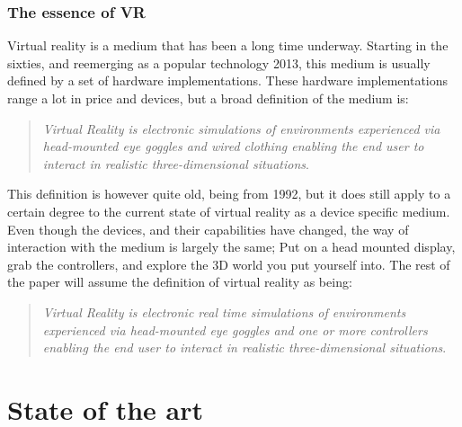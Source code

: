 		
		\subsubsection{The essence of VR}
		Virtual reality is a medium\cite{definingVirtualReality} that has been a long time underway. Starting in the sixties, and reemerging as a popular technology 2013, this medium is usually defined by a set of hardware implementations. These hardware implementations range a lot in price and devices, but a broad definition of the medium is:\\
		
		\begin{quote}
			\textit{Virtual Reality is electronic simulations of environments experienced via head-mounted eye goggles and wired clothing enabling the end user to interact in realistic three-dimensional situations}\cite{coates1992}.\\
		\end{quote}
		
		This definition is however quite old, being from 1992, but it does still apply to a certain degree to the current state of virtual reality as a device specific medium. Even though the devices, and their capabilities have changed, the way of interaction with the medium is largely the same; Put on a head mounted display, grab the controllers, and explore the 3D world you put yourself into. The rest of the paper will assume the definition of virtual reality as being:\\
		\begin{quote}
			\textit{Virtual Reality is electronic real time simulations of environments experienced via head-mounted eye goggles and one or more controllers enabling the end user to interact in realistic three-dimensional situations}\label{def:virtualRealityDefinition}.\\
		\end{quote}

    \section{State of the art}\label{sec:SOTA}
	  
